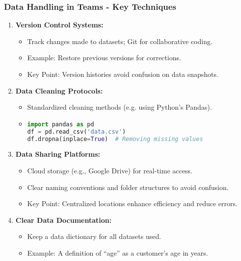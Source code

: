 \documentclass[aspectratio=169]{beamer}
\begin{document}
\begin{frame}[fragile]
    \frametitle{Data Handling in Teams - Key Techniques}
    \begin{enumerate}
        \item \textbf{Version Control Systems:}
            \begin{itemize}
                \item Track changes made to datasets; Git for collaborative coding.
                \item Example: Restore previous versions for corrections.
                \item Key Point: Version histories avoid confusion on data snapshots.
            \end{itemize}

        \item \textbf{Data Cleaning Protocols:}
            \begin{itemize}
                \item Standardized cleaning methods (e.g. using Python's Pandas).
                \item \begin{lstlisting}[language=python]
import pandas as pd
df = pd.read_csv('data.csv')
df.dropna(inplace=True)  # Removing missing values
                \end{lstlisting}
            \end{itemize}

        \item \textbf{Data Sharing Platforms:}
            \begin{itemize}
                \item Cloud storage (e.g., Google Drive) for real-time access.
                \item Clear naming conventions and folder structures to avoid confusion.
                \item Key Point: Centralized locations enhance efficiency and reduce errors.
            \end{itemize}
        
        \item \textbf{Clear Data Documentation:}
            \begin{itemize}
                \item Keep a data dictionary for all datasets used.
                \item Example: A definition of “age” as a customer’s age in years.
            \end{itemize}
    \end{enumerate}
\end{frame}
\end{document}
